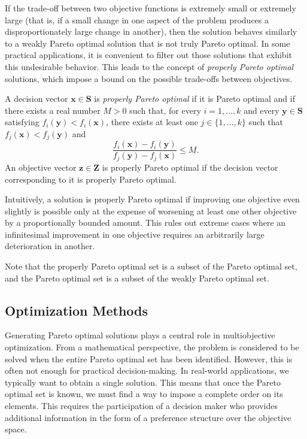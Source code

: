 If the trade-off between two objective functions is extremely small or extremely large (that is, if a small change in one aspect of the problem produces a disproportionately large change in another), then the solution behaves similarly to a weakly Pareto optimal solution that is not truly Pareto optimal. In some practical applications, it is convenient to filter out those solutions that exhibit this undesirable behavior. This leads to the concept of \emph{properly Pareto optimal} solutions, which impose a bound on the possible trade-offs between objectives.

\begin{definition}
A decision vector $\mathbf{x} \in \mathbf{S}$ is \emph{properly Pareto optimal} if it is Pareto optimal and if there exists a real number $M > 0$ such that, for every $i = 1,\ldots,k$ and every $\mathbf{y} \in \mathbf{S}$ satisfying $f_i ( \mathbf{y} ) < f_i ( \mathbf{x} )$, there exists at least one $j \in \{1,\ldots,k\}$ such that $f_j ( \mathbf{x} ) < f_j ( \mathbf{y} )$ and
\[
\frac{f_i ( \mathbf{x} ) - f_i ( \mathbf{y} )}{f_j ( \mathbf{y} ) - f_j ( \mathbf{x} )} \leq M.
\]
An objective vector $\mathbf{z} \in \mathbf{Z}$ is properly Pareto optimal if the decision vector corresponding to it is properly Pareto optimal.
\end{definition}

Intuitively, a solution is properly Pareto optimal if improving one objective even slightly is possible only at the expense of worsening at least one other objective by a proportionally bounded amount. This rules out extreme cases where an infinitesimal improvement in one objective requires an arbitrarily large deterioration in another.

Note that the properly Pareto optimal set is a subset of the Pareto optimal set, and the Pareto optimal set is a subset of the weakly Pareto optimal set.


\subsection{Optimization Methods}
\label{sec:pareto_optimization_methods}

Generating Pareto optimal solutions plays a central role in multiobjective optimization. From a mathematical perspective, the problem is considered to be solved when the entire Pareto optimal set has been identified. However, this is often not enough for practical decision-making. In real-world applications, we typically want to obtain a single solution. This means that once the Pareto optimal set is known, we must find a way to impose a complete order on its elements. This requires the participation of a decision maker who provides additional information in the form of a preference structure over the objective space.

